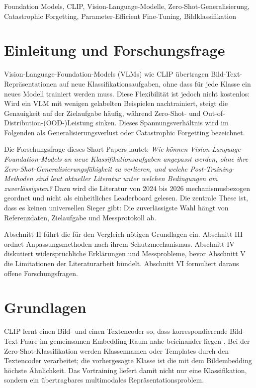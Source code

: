\documentclass[conference]{IEEEtran}
\begin{document}
\begin{IEEEkeywords}
Foundation Models, CLIP, Vision-Language-Modelle, Zero-Shot-Generalisierung, Catastrophic Forgetting, Parameter-Efficient Fine-Tuning, Bildklassifikation
\end{IEEEkeywords}

\section{Einleitung und Forschungsfrage}
Vision-Language-Foundation-Models (VLMs) wie CLIP übertragen
Bild-Text-Repräsentationen auf neue Klassifikationsaufgaben, ohne dass für
jede Klasse ein neues Modell trainiert werden muss. Diese Flexibilität ist
jedoch nicht kostenlos: Wird ein VLM mit wenigen gelabelten Beispielen
nachtrainiert, steigt die Genauigkeit auf der Zielaufgabe häufig, während
Zero-Shot- und Out-of-Distribution-(OOD-)Leistung sinken. Dieses
Spannungsverhältnis wird im Folgenden als Generalisierungsverlust oder
Catastrophic Forgetting bezeichnet.

Die Forschungsfrage dieses Short Papers lautet: \emph{Wie können
Vision-Language-Foundation-Models an neue Klassifikationsaufgaben angepasst
werden, ohne ihre Zero-Shot-Generalisierungsfähigkeit zu verlieren, und welche
Post-Training-Methoden sind laut aktueller Literatur unter welchen Bedingungen
am zuverlässigsten?} Dazu wird die Literatur von 2024 bis 2026
mechanismusbezogen geordnet und nicht als einheitliches Leaderboard gelesen.
Die zentrale These ist, dass es keinen universellen Sieger gibt: Die
zuverlässigste Wahl hängt von Referenzdaten, Zielaufgabe und Messprotokoll ab.

Abschnitt II führt die für den Vergleich nötigen Grundlagen ein. Abschnitt III
ordnet Anpassungsmethoden nach ihrem Schutzmechanismus. Abschnitt IV diskutiert
widersprüchliche Erklärungen und Messprobleme, bevor Abschnitt V die
Limitationen der Literaturarbeit bündelt. Abschnitt VI formuliert daraus
offene Forschungsfragen.

\section{Grundlagen}
CLIP lernt einen Bild- und einen Textencoder so, dass korrespondierende
Bild-Text-Paare im gemeinsamen Embedding-Raum nahe beieinander liegen
\cite{clip}. Bei der Zero-Shot-Klassifikation werden Klassennamen oder
Templates durch den Textencoder verarbeitet; die vorhergesagte Klasse ist die
mit dem Bildembedding höchste Ähnlichkeit. Das Vortraining liefert damit nicht
nur eine Klassifikation, sondern ein übertragbares multimodales
Repräsentationsproblem.
\end{document}
